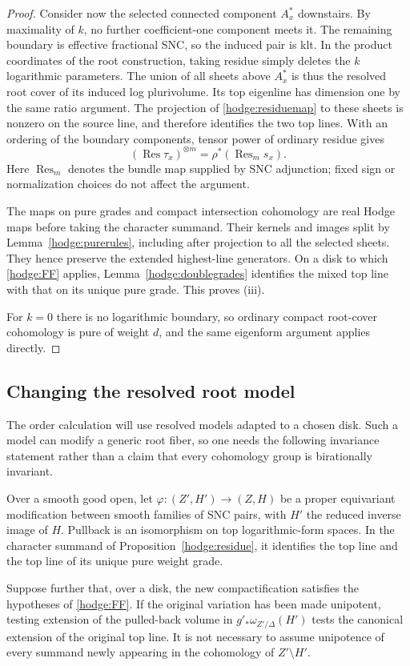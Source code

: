 \begin{proof}
Consider now the selected connected component \(A_x^*\) downstairs.
By maximality of \(k\), no further coefficient-one component meets
it.  The remaining boundary is effective fractional SNC, so the
induced pair is klt.  In the product coordinates of the root
construction, taking residue simply deletes the \(k\) logarithmic
parameters.  The union of all sheets above \(A_x^*\) is thus the
resolved root cover of its induced log plurivolume.  Its top
eigenline has dimension one by the same ratio argument.  The
projection of \eqref{hodge:residuemap} to these sheets is nonzero on
the source line, and therefore identifies the two top lines.
With an ordering of the boundary components, tensor power of
ordinary residue gives
\[
       (\operatorname{Res}\tau_x)^{\otimes m}
       =\rho^*(\operatorname{Res}_m s_x).
\]
Here \(\operatorname{Res}_m\) denotes the bundle map supplied by
SNC adjunction; fixed sign or normalization choices do not affect
the argument.

The maps on pure grades and compact intersection cohomology are
real Hodge maps before taking the character summand.  Their
kernels and images split by Lemma~\ref{hodge:purerules}, including
after projection to all the selected sheets.  They hence preserve
the extended highest-line generators.  On a disk to which
\eqref{hodge:FF} applies, Lemma~\ref{hodge:doublegrades} identifies
the mixed top line with that on its unique pure grade.  This proves
\textup{(iii)}.

For \(k=0\) there is no logarithmic boundary, so ordinary compact
root-cover cohomology is pure of weight \(d\), and the same
eigenform argument applies directly.
\end{proof}

\subsection{Changing the resolved root model}
\label{hodge:modelchanges}

The order calculation will use resolved models adapted to a chosen
disk.  Such a model can modify a generic root fiber, so one needs
the following invariance statement rather than a claim that every
cohomology group is birationally invariant.

\begin{lemma}
\label{hodge:birational}
Over a smooth good open, let
\(\varphi:(Z',H')\to(Z,H)\) be a proper equivariant modification
between smooth families of SNC pairs, with \(H'\) the reduced
inverse image of \(H\).  Pullback is an isomorphism on top
logarithmic-form spaces.  In the character summand of
Proposition~\ref{hodge:residue}, it identifies the top line and
the top line of its unique pure weight grade.

Suppose further that, over a disk, the new compactification
satisfies the hypotheses of \eqref{hodge:FF}.  If the original
variation has been made unipotent, testing extension of the
pulled-back volume in \(g'_*\omega_{Z'/\Delta}(H')\) tests the
canonical extension of the original top line.  It is not necessary
to assume unipotence of every summand newly appearing in the
cohomology of \(Z'\setminus H'\).
\end{lemma}

